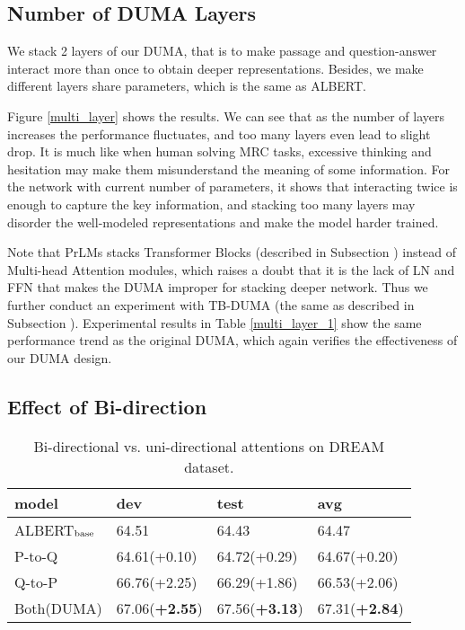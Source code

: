 \documentclass[letterpaper]{article} \usepackage{aaai21}  \usepackage{times}  \usepackage{helvet} \usepackage{courier}  \usepackage[hyphens]{url}  \usepackage{graphicx} \urlstyle{rm} \def\UrlFont{\rm}  \usepackage{natbib}  \usepackage{caption} \frenchspacing  \setlength{\pdfpagewidth}{8.5in}  \setlength{\pdfpageheight}{11in}
\begin{document}
\subsection{Number of DUMA Layers}




We stack 2 layers of our DUMA, that is to make passage and question-answer interact more than once to obtain deeper representations. Besides, we make different layers share parameters, which is the same as ALBERT. 

Figure \ref{multi_layer} shows the results. We can see that as the number of layers increases the performance fluctuates, and too many layers even lead to slight drop. It is much like when human solving MRC tasks, excessive thinking and hesitation may make them misunderstand the meaning of some information. For the network with current number of parameters, it shows that interacting twice is enough to capture the key information, and stacking too many layers may disorder the well-modeled representations and make the model harder trained. 

Note that PrLMs \cite{bert,roberta,albert} stacks Transformer Blocks (described in Subsection \textit{}) instead of Multi-head Attention modules, which raises a doubt that it is the lack of LN and FFN that makes the DUMA improper for stacking deeper network. Thus we further conduct an experiment with TB-DUMA (the same as described in Subsection \textit{}). Experimental results in Table \ref{multi_layer_1} show the same performance trend as the original DUMA, which again verifies the effectiveness of our DUMA design. 

\subsection{Effect of Bi-direction}
\begin{table}[t]\small
\renewcommand\arraystretch{1.1}
	\centering
	{
		\begin{tabular}{@{}p{1.7cm}|p{1.6cm}|p{1.6cm}|p{1.6cm}}
			\hline		
			 \;model & dev & test & avg \\
			\hline
			\hline
			\;ALBERT$_{\rm base}$ & 64.51 & 64.43 &64.47 \\
			\hline
			\;P-to-Q & 64.61\;(+0.10) & 64.72\;(+0.29) & 64.67\;(+0.20) \\
			\;Q-to-P & 66.76\;(+2.25) & 66.29\;(+1.86) & 66.53\;(+2.06)\\
			\;Both(DUMA) & 67.06\;(\textbf{+2.55}) & 67.56\;(\textbf{+3.13}) & 67.31\;(\textbf{+2.84})\\
			\hline
		\end{tabular}
		
	}
	\caption{\label{single_direction} Bi-directional vs. uni-directional attentions on DREAM dataset.}
\end{table}
\end{document}
